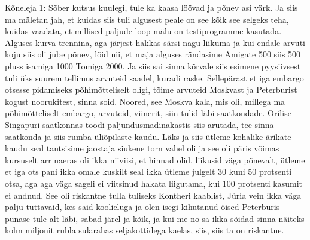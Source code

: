 Kõneleja 1:
Sõber kutsus kuulegi, tule ka kaasa löövad ja põnev asi värk.
Ja siis ma mäletan jah, et kuidas siis tuli algusest peale on see kõik see selgeks teha, kuidas vaadata, et millised paljude loop mälu on testiprogramme kasutada. Alguses kurva trennina, aga järjest hakkas särsi nagu liikuma ja kui endale arvuti koju siis oli jube põnev, lõid nii, et maja alguses rändasime Amigate 500 siis 500 pluss isamiga 1000 Tomiga 2000. Ja siis sai sinna kõrvale siis esimene pyysiivsest tuli üks suurem tellimus arvuteid saadel, kuradi raske. Sellepärast et iga embargo otsesse pidamiseks põhimõtteliselt oligi, tõime arvuteid Moskvast ja Peterburist kogust noorukitest, sinna soid. Noored, see Moskva kala, mis oli, millega ma põhimõtteliselt embargo, arvuteid, viinerit, siin tulid läbi saatkondade. Orilise Singapuri saatkonnas toodi paljundusmadinakastis siis arutada, tee sinna saatkonda ja siis rumba üliõpilaste kaudu. Läks ja siis ütleme kohalike ärikate kaudu seal tantsisime jaostaja siukene torn vahel oli ja see oli päris võimas kursuselt arr naeras oli ikka niiviisi, et hinnad olid, liikusid väga põnevalt, ütleme et iga ots pani ikka omale kuskilt seal ikka ütleme julgelt 30 kuni 50 protsenti otsa, aga aga väga sageli ei viitsinud hakata liigutama, kui 100 protsenti kasumit ei andnud. See oli riskantne tulla tuliseks Kontheri kaablist, Jüria vein ikka väga palju tuttavaid, kes said koolieluga ja olen isegi kihutanud öised Peterburis punase tule alt läbi, sabad järel ja kõik, ja kui me no sa ikka sõidad sinna näiteks kolm miljonit rubla sularahas seljakottidega kaelas, siis, siis ta on riskantne.
